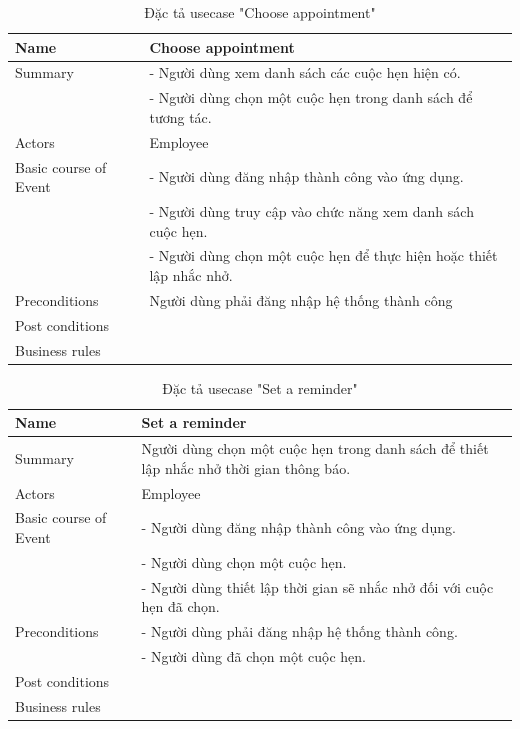 \documentclass[a4paper]{article}
\begin{document}
\begin{table}[!h]
    \centering
    \begin{tabular}{|m{3.2cm}|m{10.5cm}|}
        \hline
        Name & Choose appointment\\
        \hline
        Summary & -	Người dùng xem danh sách các cuộc hẹn hiện có.\\
&-	Người dùng chọn một cuộc hẹn trong danh sách để tương tác.\\
        \hline
        Actors & Employee\\
        \hline
        Basic course of Event & -	Người dùng đăng nhập thành công vào ứng dụng.\\
&-	Người dùng truy cập vào chức năng xem danh sách cuộc hẹn.\\
&-	Người dùng chọn một cuộc hẹn để thực hiện hoặc thiết lập nhắc nhở. \\
        \hline
        Preconditions & Người dùng  phải đăng nhập hệ thống thành công\\
        \hline
        Post conditions & \\
        \hline
        Business rules & \\
        \hline
    \end{tabular}
    \caption{Đặc tả usecase "Choose appointment"}
\end{table}
\begin{table}[!h]
    \centering
    \begin{tabular}{|m{3.2cm}|m{10.5cm}|}
        \hline
        Name & Set a reminder\\
        \hline
        Summary & Người dùng chọn một cuộc hẹn trong danh sách để thiết lập nhắc nhở thời gian thông báo.\\
        \hline
        Actors & Employee\\
        \hline
        Basic course of Event & -	Người dùng đăng nhập thành công vào ứng dụng.\\
&-	Người dùng chọn một cuộc hẹn.\\
&-	Người dùng thiết lập thời gian sẽ nhắc nhở đối với cuộc hẹn đã chọn.\\
        \hline
        Preconditions & -	Người dùng  phải đăng nhập hệ thống thành công.\\
&-	Người dùng đã chọn một cuộc hẹn.\\
        \hline
        Post conditions &\\
        \hline
        Business rules & \\
        \hline
    \end{tabular}
    \caption{Đặc tả usecase "Set a reminder"}
\end{table}
\end{document}
